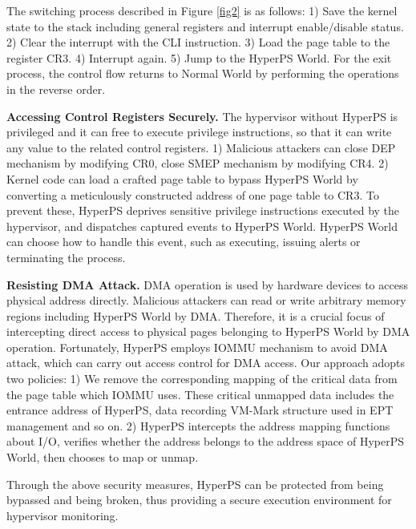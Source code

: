 \documentclass[conference]{IEEEtran}
\begin{document}
The switching process described in Figure \ref{fig2} is as follows: 1) Save the kernel state to the stack including general registers and interrupt enable/disable status. 2) Clear the interrupt with the CLI instruction. 3) Load the page table to the register CR3. 4) Interrupt again. 5) Jump to the HyperPS World. For the exit process, the control flow returns to Normal World by performing the operations in the reverse order.


\textbf{Accessing Control Registers Securely.}
The hypervisor without HyperPS is privileged and it can free to execute privilege instructions, so that it can write any value to the related control registers. 1) Malicious attackers can close DEP mechanism by modifying CR0, close SMEP mechanism by modifying CR4. 2) Kernel code can load a crafted page table to bypass HyperPS World by converting a meticulously constructed address of one page table to CR3.
To prevent these, HyperPS deprives sensitive privilege instructions executed by the hypervisor, and dispatches captured events to HyperPS World. HyperPS World can choose how to handle this event, such as executing, issuing alerts or terminating the process. 

\textbf{Resisting DMA Attack.}
DMA operation is used by hardware devices to access physical address directly. Malicious attackers can read or write arbitrary memory regions including HyperPS World by DMA. Therefore, it is a crucial focus of intercepting direct access to physical pages belonging to HyperPS World by DMA operation. 
Fortunately, HyperPS employs IOMMU mechanism to avoid DMA attack, which can carry out access control for DMA access. Our approach adopts two policies: 1) We remove the corresponding mapping of the critical data from the page table which IOMMU uses. These critical unmapped data includes the entrance address of HyperPS, data recording VM-Mark structure used in EPT management and so on. 2) HyperPS intercepts the address mapping functions about I/O, verifies whether the address belongs to the address space of HyperPS World, then chooses to map or unmap.


Through the above security measures, HyperPS can be protected from being bypassed and being broken, thus providing a secure execution environment for hypervisor monitoring.





%
%
\end{document}

